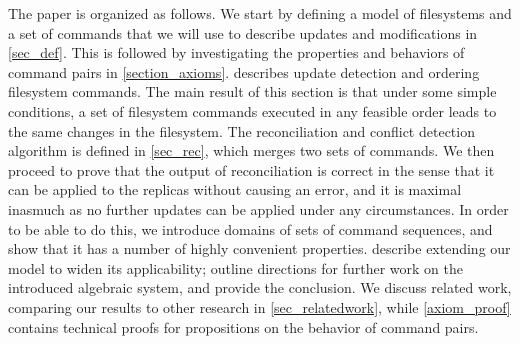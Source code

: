 The paper is organized as follows.
%
We start by defining a model of filesystems and a set of commands
that we will use to describe updates and modifications in \cref{sec_def}.
%
This is followed by investigating the properties and behaviors
of command pairs in \cref{section_axioms}.
%
 describes update detection and ordering filesystem commands.
The main result of this section is that under some simple conditions,
a set of filesystem commands executed in any feasible order leads
to the same changes in the filesystem.
%
The reconciliation and conflict detection algorithm is defined in
\cref{sec_rec}, which merges two sets of commands.
We then proceed to prove that the output of reconciliation
is correct in the sense that 
it can be applied to the replicas without causing an error,
and it is maximal
inasmuch as no further updates can be applied under any circumstances.
In order to be able to do this, we introduce
domains of sets of command sequences,
and show that it has a number of highly convenient properties.
%
describe extending our model to widen its applicability;
outline directions for further work on the introduced algebraic system,
and provide the conclusion.
%
We discuss related work, comparing our results to other research in \cref{sec_relatedwork},
while
\cref{axiom_proof} contains technical proofs for propositions on the behavior of command pairs.

